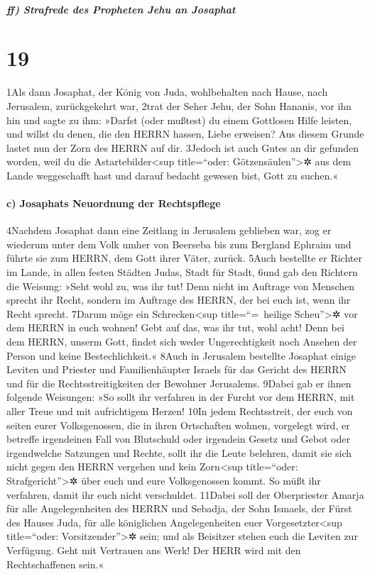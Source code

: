 \hypertarget{ff-strafrede-des-propheten-jehu-an-josaphat}{%
\subparagraph{ff) Strafrede des Propheten Jehu an
Josaphat}\label{ff-strafrede-des-propheten-jehu-an-josaphat}}

\hypertarget{section-18}{%
\section{19}\label{section-18}}

1Als dann Josaphat, der König von Juda, wohlbehalten nach Hause, nach
Jerusalem, zurückgekehrt war, 2trat der Seher Jehu, der Sohn Hananis,
vor ihn hin und sagte zu ihm: »Darfst (oder mußtest) du einem Gottlosen
Hilfe leisten, und willst du denen, die den HERRN hassen, Liebe
erweisen? Aus diesem Grunde lastet nun der Zorn des HERRN auf dir.
3Jedoch ist auch Gutes an dir gefunden worden, weil du die
Astartebilder\textless sup title=``oder: Götzensäulen''\textgreater✲ aus
dem Lande weggeschafft hast und darauf bedacht gewesen bist, Gott zu
suchen.«

\hypertarget{c-josaphats-neuordnung-der-rechtspflege}{%
\paragraph{c) Josaphats Neuordnung der
Rechtspflege}\label{c-josaphats-neuordnung-der-rechtspflege}}

4Nachdem Josaphat dann eine Zeitlang in Jerusalem geblieben war, zog er
wiederum unter dem Volk umher von Beerseba bis zum Bergland Ephraim und
führte sie zum HERRN, dem Gott ihrer Väter, zurück. 5Auch bestellte er
Richter im Lande, in allen festen Städten Judas, Stadt für Stadt, 6und
gab den Richtern die Weisung: »Seht wohl zu, was ihr tut! Denn nicht im
Auftrage von Menschen sprecht ihr Recht, sondern im Auftrage des HERRN,
der bei euch ist, wenn ihr Recht sprecht. 7Darum möge ein
Schrecken\textless sup title=``=~heilige Scheu''\textgreater✲ vor dem
HERRN in euch wohnen! Gebt auf das, was ihr tut, wohl acht! Denn bei dem
HERRN, unserm Gott, findet sich weder Ungerechtigkeit noch Ansehen der
Person und keine Bestechlichkeit.« 8Auch in Jerusalem bestellte Josaphat
einige Leviten und Priester und Familienhäupter Israels für das Gericht
des HERRN und für die Rechtsstreitigkeiten der Bewohner Jerusalems.
9Dabei gab er ihnen folgende Weisungen: »So sollt ihr verfahren in der
Furcht vor dem HERRN, mit aller Treue und mit aufrichtigem Herzen! 10In
jedem Rechtsstreit, der euch von seiten eurer Volksgenossen, die in
ihren Ortschaften wohnen, vorgelegt wird, er betreffe irgendeinen Fall
von Blutschuld oder irgendein Gesetz und Gebot oder irgendwelche
Satzungen und Rechte, sollt ihr die Leute belehren, damit sie sich nicht
gegen den HERRN vergehen und kein Zorn\textless sup title=``oder:
Strafgericht''\textgreater✲ über euch und eure Volksgenossen kommt. So
müßt ihr verfahren, damit ihr euch nicht verschuldet. 11Dabei soll der
Oberpriester Amarja für alle Angelegenheiten des HERRN und Sebadja, der
Sohn Ismaels, der Fürst des Hauses Juda, für alle königlichen
Angelegenheiten euer Vorgesetzter\textless sup title=``oder:
Vorsitzender''\textgreater✲ sein; und als Beisitzer stehen euch die
Leviten zur Verfügung. Geht mit Vertrauen ans Werk! Der HERR wird mit
den Rechtschaffenen sein.«

